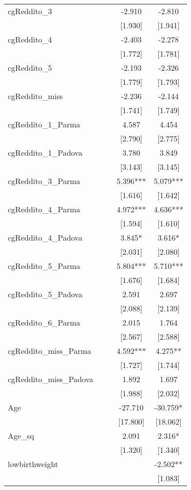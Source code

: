 \documentclass[]{article}
\begin{document}
\begin{tabular}{lcccc}
cgReddito\_3 &  &  & -2.910 & -2.810 \\
 &  &  & [1.930] & [1.941] \\
cgReddito\_4 &  &  & -2.403 & -2.278 \\
 &  &  & [1.772] & [1.781] \\
cgReddito\_5 &  &  & -2.193 & -2.326 \\
 &  &  & [1.779] & [1.793] \\
cgReddito\_miss &  &  & -2.236 & -2.144 \\
 &  &  & [1.741] & [1.749] \\
cgReddito\_1\_Parma &  &  & 4.587 & 4.454 \\
 &  &  & [2.790] & [2.775] \\
cgReddito\_1\_Padova &  &  & 3.780 & 3.849 \\
 &  &  & [3.143] & [3.145] \\
cgReddito\_3\_Parma &  &  & 5.396*** & 5.079*** \\
 &  &  & [1.616] & [1.642] \\
cgReddito\_4\_Parma &  &  & 4.972*** & 4.636*** \\
 &  &  & [1.594] & [1.610] \\
cgReddito\_4\_Padova &  &  & 3.845* & 3.616* \\
 &  &  & [2.031] & [2.080] \\
cgReddito\_5\_Parma &  &  & 5.804*** & 5.710*** \\
 &  &  & [1.676] & [1.684] \\
cgReddito\_5\_Padova &  &  & 2.591 & 2.697 \\
 &  &  & [2.088] & [2.139] \\
cgReddito\_6\_Parma &  &  & 2.015 & 1.764 \\
 &  &  & [2.567] & [2.588] \\
cgReddito\_miss\_Parma &  &  & 4.592*** & 4.275** \\
 &  &  & [1.727] & [1.744] \\
cgReddito\_miss\_Padova &  &  & 1.892 & 1.697 \\
 &  &  & [1.988] & [2.032] \\
Age &  &  & -27.710 & -30.759* \\
 &  &  & [17.800] & [18.062] \\
Age\_sq &  &  & 2.091 & 2.316* \\
 &  &  & [1.320] & [1.340] \\
lowbirthweight &  &  &  & -2.502** \\
 &  &  &  & [1.083] \\

\end{tabular}
\end{document}
